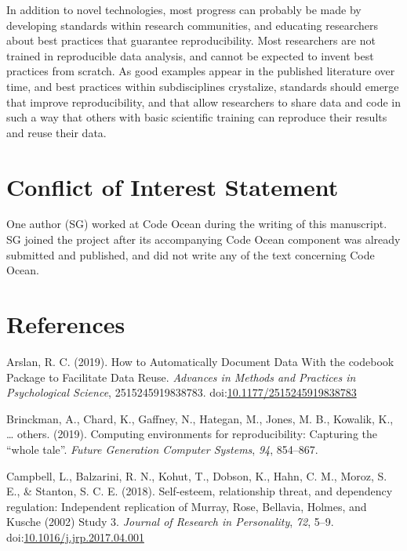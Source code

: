\documentclass[,jou, a4paper,floatsintext]{apa6}
\begin{document}
In addition to novel technologies, most progress can probably be made by developing standards within research communities, and educating researchers about best practices that guarantee reproducibility. Most researchers are not trained in reproducible data analysis, and cannot be expected to invent best practices from scratch. As good examples appear in the published literature over time, and best practices within subdisciplines crystalize, standards should emerge that improve reproducibility, and that allow researchers to share data and code in such a way that others with basic scientific training can reproduce their results and reuse their data.

\hypertarget{conflict-of-interest-statement}{%
\section{Conflict of Interest Statement}\label{conflict-of-interest-statement}}

One author (SG) worked at Code Ocean during the writing of this manuscript. SG joined the project after its accompanying Code Ocean component was already submitted and published, and did not write any of the text concerning Code Ocean.

\hypertarget{references}{%
\section{References}\label{references}}

\setlength{\parindent}{-0.5in}
\setlength{\leftskip}{0.5in}

\hypertarget{refs}{}
\leavevmode\hypertarget{ref-arslan_how_2019}{}%
Arslan, R. C. (2019). How to Automatically Document Data With the codebook Package to Facilitate Data Reuse. \emph{Advances in Methods and Practices in Psychological Science}, 2515245919838783. doi:\href{https://doi.org/10.1177/2515245919838783}{10.1177/2515245919838783}

\leavevmode\hypertarget{ref-brinckman2019computing}{}%
Brinckman, A., Chard, K., Gaffney, N., Hategan, M., Jones, M. B., Kowalik, K., \ldots{} others. (2019). Computing environments for reproducibility: Capturing the ``whole tale''. \emph{Future Generation Computer Systems}, \emph{94}, 854--867.

\leavevmode\hypertarget{ref-campbell_self-esteem_2018}{}%
Campbell, L., Balzarini, R. N., Kohut, T., Dobson, K., Hahn, C. M., Moroz, S. E., \& Stanton, S. C. E. (2018). Self-esteem, relationship threat, and dependency regulation: Independent replication of Murray, Rose, Bellavia, Holmes, and Kusche (2002) Study 3. \emph{Journal of Research in Personality}, \emph{72}, 5--9. doi:\href{https://doi.org/10.1016/j.jrp.2017.04.001}{10.1016/j.jrp.2017.04.001}
\end{document}
